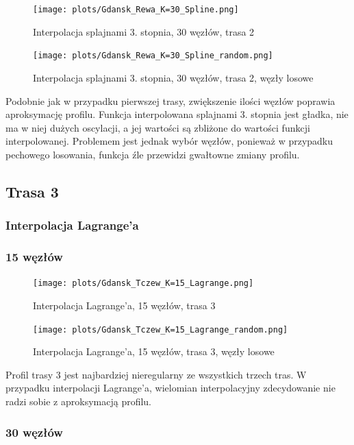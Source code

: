 \documentclass{article}
\begin{document}
\begin{figure}[H]
    \centering
    \texttt{[image: plots/Gdansk\_Rewa\_K=30\_Spline.png]}
    \caption{Interpolacja splajnami 3. stopnia, 30 węzłów, trasa 2}
\end{figure}

\begin{figure}[H]
    \centering
    \texttt{[image: plots/Gdansk\_Rewa\_K=30\_Spline\_random.png]}
    \caption{Interpolacja splajnami 3. stopnia, 30 węzłów, trasa 2, węzły losowe}
\end{figure}

Podobnie jak w przypadku pierwszej trasy, zwiększenie ilości węzłów poprawia aproksymację profilu.
Funkcja interpolowana splajnami 3. stopnia jest gładka, nie ma w niej dużych oscylacji,
a jej wartości są zbliżone do wartości funkcji interpolowanej. Problemem jest jednak
wybór węzłów, ponieważ w przypadku pechowego losowania, funkcja źle przewidzi gwałtowne zmiany profilu.

\subsection{Trasa 3}

\subsubsection{Interpolacja Lagrange'a}

\subsubsection*{\hfil 15 węzłów \hfil }

\begin{figure}[H]
    \centering
    \texttt{[image: plots/Gdansk\_Tczew\_K=15\_Lagrange.png]}
    \caption{Interpolacja Lagrange'a, 15 węzłów, trasa 3}
\end{figure}

\begin{figure}[H]
    \centering
    \texttt{[image: plots/Gdansk\_Tczew\_K=15\_Lagrange\_random.png]}
    \caption{Interpolacja Lagrange'a, 15 węzłów, trasa 3, węzły losowe}
\end{figure}

Profil trasy 3 jest najbardziej nieregularny ze wszystkich trzech tras. W przypadku interpolacji
Lagrange'a, wielomian interpolacyjny zdecydowanie nie radzi sobie z aproksymacją profilu.

\subsubsection*{\hfil 30 węzłów \hfil }
\end{document}
